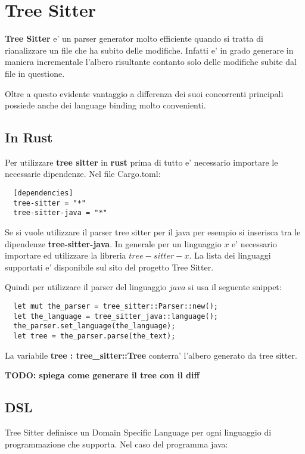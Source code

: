 \chapter{Tree Sitter}

\textbf{Tree Sitter} e' un parser generator molto efficiente quando si tratta di rianalizzare un file che ha subito delle modifiche. Infatti e' in grado generare in maniera incrementale l'albero risultante contanto solo delle modifiche subite dal file in questione.

Oltre a questo evidente vantaggio a differenza dei suoi concorrenti principali possiede anche dei language binding molto convenienti.

\section{In Rust}

Per utilizzare \textbf{tree sitter} in \textbf{rust} prima di tutto e' necessario importare le necessarie dipendenze. Nel file Cargo.toml:

\begin{verbatim}
  [dependencies]
  tree-sitter = "*"
  tree-sitter-java = "*"
\end{verbatim}

Se si vuole utilizzare il parser tree sitter per il java per esempio si inserisca tra le dipendenze \textbf{tree-sitter-java}. In generale per un linguaggio $x$ e' necessario importare ed utilizzare la libreria $tree-sitter-x$. La lista dei linguaggi supportati e' disponibile sul sito del progetto Tree Sitter.

Quindi per utilizzare il parser del linguaggio $java$ si usa il seguente snippet:

\begin{verbatim}
  let mut the_parser = tree_sitter::Parser::new();
  let the_language = tree_sitter_java::language();
  the_parser.set_language(the_language);
  let tree = the_parser.parse(the_text);
\end{verbatim}

La variabile \textbf{tree : tree\_sitter::Tree} conterra' l'albero generato da tree sitter.

\textbf{TODO: spiega come generare il tree con il diff}

\section{DSL}

Tree Sitter definisce un Domain Specific Language per ogni linguaggio di programmazione che supporta. Nel caso del programma java:

